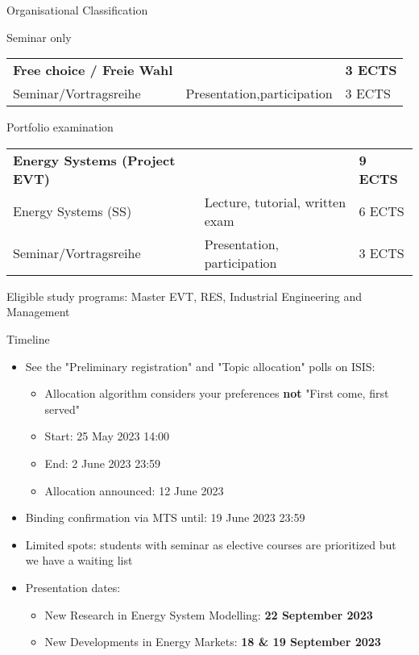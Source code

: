 \documentclass[10pt,aspectratio=169,dvipsnames]{beamer}
\begin{document}
\begin{frame}{Organisational Classification}

    \begin{block}{Seminar only}
          \begin{tabularx}{0.8\textwidth}{l l l}
            \textbf{Free choice / Freie Wahl} & & \textbf{3 ECTS}\\
            Seminar/Vortragsreihe & Presentation,participation & 3 ECTS
          \end{tabularx}
    \end{block}
    \begin{block}{Portfolio examination}
    \begin{tabularx}{0.8\textwidth}{l l l}
            \textbf{Energy Systems (Project EVT)} & & \textbf{9 ECTS}\\
            Energy Systems (SS)   & Lecture, tutorial, written exam & 6 ECTS \\
            Seminar/Vortragsreihe & Presentation, participation     & 3 ECTS
      \end{tabularx}
      \newline
      \newline
      Eligible study programs: Master EVT, RES, Industrial Engineering and Management
  \end{block}
          


\end{frame}


\begin{frame}{Timeline}

  \begin{itemize}
    \item See the "Preliminary registration" and "Topic allocation" polls on ISIS: 
        \begin{itemize}
            \item Allocation algorithm considers your preferences \textbf{not} "First come, first served"
            \item Start: 25 May 2023 14:00
            \item End: 2 June 2023 23:59
            \item Allocation announced: 12 June 2023 
          \end{itemize}
    \item Binding confirmation via MTS until: 19 June 2023 23:59
    \item Limited spots: students with seminar as elective courses are prioritized but we have a waiting list
    \item Presentation dates:
          \begin{itemize}
            \item New Research in Energy System Modelling: \textbf{22 September 2023}
            \item New Developments in Energy Markets: \textbf{18 \& 19  September 2023}
          \end{itemize}
  \end{itemize}

\end{frame}
\end{document}
